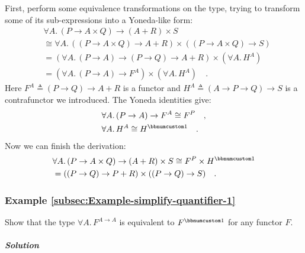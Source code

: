 First, perform some equivalence transformations on the type, trying
to transform some of its sub-expressions into a Yoneda-like form:
\begin{align*}
 & \forall A.\,(P\rightarrow A\times Q)\rightarrow(A+R)\times S\\
 & \cong\forall A.\,((P\rightarrow A\times Q)\rightarrow A+R)\times((P\rightarrow A\times Q)\rightarrow S)\\
 & =(\forall A.\,(P\rightarrow A)\rightarrow(P\rightarrow Q)\rightarrow A+R)\times(\forall A.\,H^{A})\\
 & =(\forall A.\,(P\rightarrow A)\rightarrow F^{A})\times(\forall A.\,H^{A})\quad.
\end{align*}
Here $F^{A}\triangleq(P\rightarrow Q)\rightarrow A+R$ is a functor
and $H^{A}\triangleq(A\rightarrow P\rightarrow Q)\rightarrow S$ is
a contrafunctor we introduced. The Yoneda identities give:
\begin{align*}
 & \forall A.\,(P\rightarrow A)\rightarrow F^{A}\cong F^{P}\quad,\\
 & \forall A.\,H^{A}\cong H^{\bbnum 1}\quad.
\end{align*}
Now we can finish the derivation:
\begin{align*}
 & \forall A.\,(P\rightarrow A\times Q)\rightarrow(A+R)\times S\cong F^{P}\times H^{\bbnum 1}\\
 & =((P\rightarrow Q)\rightarrow P+R)\times((P\rightarrow Q)\rightarrow S)\quad.
\end{align*}


\subsubsection{Example \label{subsec:Example-simplify-quantifier-1}\ref{subsec:Example-simplify-quantifier-1}}

Show that the type $\forall A.\,F^{A\rightarrow A}$ is equivalent
to $F^{\bbnum 1}$ for any functor $F$. 

\subparagraph{Solution}

